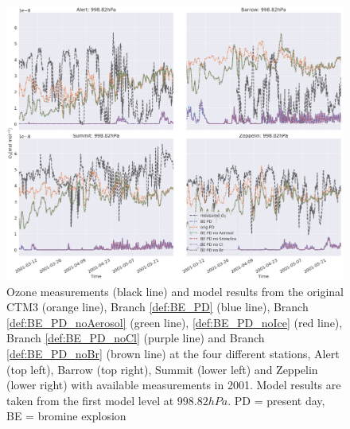 \begin{figure}
    \centering
    \includegraphics[width = \linewidth]{Chapter6_Results/images/ozone_2001_testRemoveHetReacts.png}
    \caption{Ozone measurements (black line) and model results from the original CTM3 (orange line), Branch \ref{def:BE_PD} (blue line), Branch \ref{def:BE_PD_noAerosol} (green line), \ref{def:BE_PD_noIce} (red line), Branch \ref{def:BE_PD_noCl} (purple line) and Branch \ref{def:BE_PD_noBr} (brown line) at the four different stations, Alert (top left), Barrow (top right), Summit (lower left) and Zeppelin (lower right) with available measurements in 2001. Model results are taken from the first model level at $998.82 hPa$. PD = present day, BE = bromine explosion}
    \label{fig:test_RemoveHetReacts}
\end{figure}